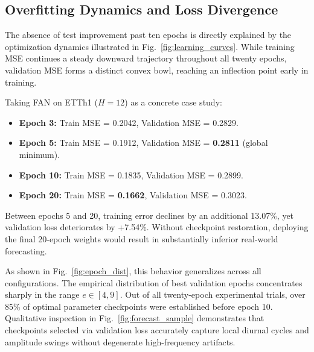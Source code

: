 \documentclass[journal]{IEEEtran}
\begin{document}
\subsection{Overfitting Dynamics and Loss Divergence}
The absence of test improvement past ten epochs is directly explained by the optimization dynamics illustrated in Fig.~\ref{fig:learning_curves}. While training MSE continues a steady downward trajectory throughout all twenty epochs, validation MSE forms a distinct convex bowl, reaching an inflection point early in training.

Taking FAN on ETTh1 ($H=12$) as a concrete case study:
\begin{itemize}
    \item \textbf{Epoch 3:} Train MSE = 0.2042, Validation MSE = 0.2829.
    \item \textbf{Epoch 5:} Train MSE = 0.1912, Validation MSE = \textbf{0.2811} (global minimum).
    \item \textbf{Epoch 10:} Train MSE = 0.1835, Validation MSE = 0.2899.
    \item \textbf{Epoch 20:} Train MSE = \textbf{0.1662}, Validation MSE = 0.3023.
\end{itemize}
Between epochs 5 and 20, training error declines by an additional 13.07\%, yet validation loss deteriorates by +7.54\%. Without checkpoint restoration, deploying the final 20-epoch weights would result in substantially inferior real-world forecasting.

As shown in Fig.~\ref{fig:epoch_dist}, this behavior generalizes across all configurations. The empirical distribution of best validation epochs concentrates sharply in the range $e \in [4, 9]$. Out of all twenty-epoch experimental trials, over 85\% of optimal parameter checkpoints were established before epoch 10. Qualitative inspection in Fig.~\ref{fig:forecast_sample} demonstrates that checkpoints selected via validation loss accurately capture local diurnal cycles and amplitude swings without degenerate high-frequency artifacts.
\end{document}
